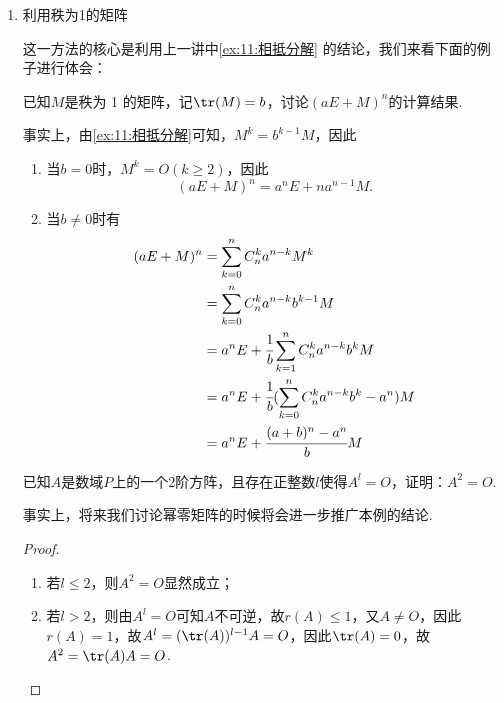 \begin{enumerate}
    \item 利用秩为1的矩阵

          这一方法的核心是利用上一讲中\autoref{ex:11:相抵分解} 的结论，我们来看下面的例子进行体会：
          \begin{example}
              已知$M$是秩为 1 的矩阵，记$\tr(M)=b$，讨论$(aE+M)^n$的计算结果.
          \end{example}
          \begin{solution}
            事实上，由\autoref{ex:11:相抵分解}可知，$M^k=b^{k-1}M$，因此
            \begin{enumerate}
                \item 当$b=0$时，$M^k=O(k\geqslant 2)$，因此
                \[(aE+M)^n=a^nE+na^{n-1}M.\]
                \item 当$b\neq 0$时有
                \begin{align*}
                    (aE+M)^n&=\sum\limits_{k=0}^nC_n^ka^{n-k}M^k \\
                    &=\sum\limits_{k=0}^nC_n^ka^{n-k}b^{k-1}M \\
                    &=a^nE+\cfrac{1}{b}\sum\limits_{k=1}^nC_n^ka^{n-k}b^kM \\
                    &=a^nE+\cfrac{1}{b}(\sum\limits_{k=0}^nC_n^ka^{n-k}b^k-a^n)M \\
                    &=a^nE+\cfrac{(a+b)^n-a^n}{b}M \\
                \end{align*}
            \end{enumerate}
          \end{solution}

          \begin{example}
              已知$A$是数域$P$上的一个2阶方阵，且存在正整数$l$使得$A^l=O$，证明：$A^2=O$.
          \end{example}
          事实上，将来我们讨论幂零矩阵的时候将会进一步推广本例的结论.

          \begin{proof}
            \begin{enumerate}
                \item 若$l\leqslant 2$，则$A^2=O$显然成立；
                \item 若$l>2$，则由$A^l=O$可知$A$不可逆，故$r(A)\leqslant 1$，又$A\neq O$，因此$r(A)=1$，故$A^l=(\tr(A))^{l-1}A=O$，因此$\tr(A)=0$，故$A^2=\tr(A)A=O$.
            \end{enumerate}
          \end{proof}


\end{enumerate}
